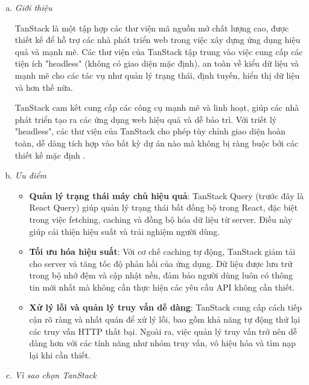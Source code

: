     \begin{enumerate}[(a)]
        \item \textit{Giới thiệu}

            TanStack là một tập hợp các thư viện mã nguồn mở chất lượng cao, được thiết kế để hỗ trợ các nhà phát triển web trong việc xây dựng ứng dụng hiệu quả và mạnh mẽ. Các thư viện của TanStack tập trung vào việc cung cấp các tiện ích "headless" (không có giao diện mặc định), an toàn về kiểu dữ liệu và mạnh mẽ cho các tác vụ như quản lý trạng thái, định tuyến, hiển thị dữ liệu và hơn thế nữa.

            TanStack cam kết cung cấp các công cụ mạnh mẽ và linh hoạt, giúp các nhà phát triển tạo ra các ứng dụng web hiệu quả và dễ bảo trì. Với triết lý "headless", các thư viện của TanStack cho phép tùy chỉnh giao diện hoàn toàn, dễ dàng tích hợp vào bất kỳ dự án nào mà không bị ràng buộc bởi các thiết kế mặc định \cite{TanStack}.
        
        \item \textit{Ưu điểm}

        \begin{itemize}
            \item \textbf{Quản lý trạng thái máy chủ hiệu quả}: TanStack Query (trước đây là React Query) giúp quản lý trạng thái bất đồng bộ trong React, đặc biệt trong việc fetching, caching và đồng bộ hóa dữ liệu từ server. Điều này giúp cải thiện hiệu suất và trải nghiệm người dùng.
            \item \textbf{Tối ưu hóa hiệu suất}: Với cơ chế caching tự động, TanStack giảm tải cho server và tăng tốc độ phản hồi của ứng dụng. Dữ liệu được lưu trữ trong bộ nhớ đệm và cập nhật nền, đảm bảo người dùng luôn có thông tin mới nhất mà không cần thực hiện các yêu cầu API không cần thiết. 
            \item \textbf{Xử lý lỗi và quản lý truy vấn dễ dàng}: TanStack cung cấp cách tiếp cận rõ ràng và nhất quán để xử lý lỗi, bao gồm khả năng tự động thử lại các truy vấn HTTP thất bại. Ngoài ra, việc quản lý truy vấn trở nên dễ dàng hơn với các tính năng như nhóm truy vấn, vô hiệu hóa và tìm nạp lại khi cần thiết.
        \end{itemize}

        \item \textit{Vì sao chọn TanStack} 


\end{enumerate}
